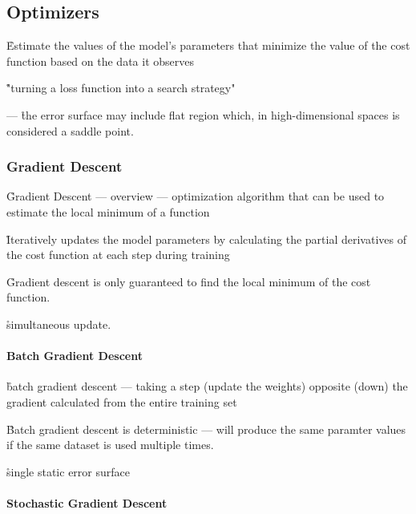 \subsection{Optimizers}

\r{Estimate the values of the model's parameters that minimize the value of the cost function based on the data it observes}

\r{"turning a loss function into a search strategy"}


 --- \r{the error surface may include flat region which, in high-dimensional spaces is considered a saddle point.}

\subsubsection{Gradient Descent}

\r{Gradient Descent --- overview --- optimization algorithm that can be used to estimate the local minimum of a function}

\r{Iteratively updates the model parameters by calculating the partial derivatives of the cost function at each step during training}

\r{Gradient descent is only guaranteed to find the local minimum of the cost function.}

\r{simultaneous update.}



\paragraph{Batch Gradient Descent}

\r{batch gradient descent --- taking a step (update the weights) opposite (down) the gradient calculated from the entire training set}

\r{Batch gradient descent is deterministic --- will produce the same paramter values if the same dataset is used multiple times.}

\r{single static error surface}


\paragraph{Stochastic Gradient Descent}

